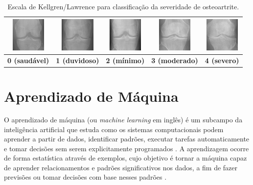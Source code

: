 \begin{table}[htbp]
    \centering
    \begin{tabular}{|c|c|c|c|c|}
        \hline
        \includegraphics[width=1.7cm]{figs/KL0-sample.png} & \includegraphics[width=1.7cm]{figs/KL1-sample.png} & \includegraphics[width=1.7cm]{figs/KL2-sample.png} & \includegraphics[width=1.7cm]{figs/KL3-sample.png} & \includegraphics[width=1.7cm]{figs/KL4-sample.png} \\
        \hline
        \textbf{0 (saudável)} & \textbf{1 (duvidoso)} & \textbf{2 (mínimo)} & \textbf{3 (moderado)} & \textbf{4 (severo)} \\
        \hline
    \end{tabular}
    \caption{Escala de Kellgren/Lawrence para classificação da severidade de osteoartrite.}
    \label{tabela-kl}
\end{table}

\section{Aprendizado de Máquina}\label{sec:aprendizado-maquina}

O aprendizado de máquina (ou \textit{machine learning} em inglês) é um subcampo da inteligência artificial que estuda como os sistemas computacionais podem aprender a partir de dados, identificar padrões, executar tarefas automaticamente e tomar decisões sem serem explicitamente programados \citep{ibm2018}. A aprendizagem ocorre de forma estatística através de exemplos, cujo objetivo é tornar a máquina capaz de aprender relacionamentos e padrões significativos nos dados, a fim de fazer previsões ou tomar decisões com base nesses padrões \citep{Bishop2007}.

